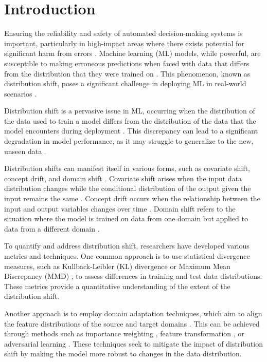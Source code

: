 
\section{Introduction}

Ensuring the reliability and safety of automated decision-making systems is important, particularly in high-impact areas where there exists potential for significant harm from errors \cite{amodei2016concrete}. 
Machine learning (ML) models, while powerful, are susceptible to making erroneous predictions when faced with data that differs from the distribution that they were trained on \cite{hendrycks2021many}. 
This phenomenon, known as distribution shift, poses a significant challenge in deploying ML in real-world scenarios \cite{quinonero2009dataset}.

Distribution shift is a pervasive issue in ML, occurring when the distribution of the data used to train a model differs from the distribution of the data that the model encounters during deployment \cite{quinonero2009dataset}. This discrepancy can lead to a significant degradation in model performance, as it may struggle to generalize to the new, unseen data \cite{hendrycks2019benchmarking}. 

Distribution shifts can manifest itself in various forms, such as covariate shift, concept drift, and domain shift \cite{moreno2012unifying}. Covariate shift arises when the input data distribution changes while the conditional distribution of the output given the input remains the same \cite{shimodaira2000improving}. Concept drift occurs when the relationship between the input and output variables changes over time \cite{gama2014survey}. Domain shift refers to the situation where the model is trained on data from one domain but applied to data from a different domain \cite{patel2015visual}.

To quantify and address distribution shift, researchers have developed various metrics and techniques. One common approach is to use statistical divergence measures, such as Kullback-Leibler (KL) divergence \cite{kullback1951information} or Maximum Mean Discrepancy (MMD) \cite{gretton2012kernel}, to assess differences in training and test data distributions. These metrics provide a quantitative understanding of the extent of the distribution shift.

Another approach is to employ domain adaptation techniques, which aim to align the feature distributions of the source and target domains \cite{wang2018deep}. This can be achieved through methods such as importance weighting \cite{sugiyama2007covariate}, feature transformation \cite{pan2009survey}, or adversarial learning \cite{ganin2016domain}. These techniques seek to mitigate the impact of distribution shift by making the model more robust to changes in the data distribution.

